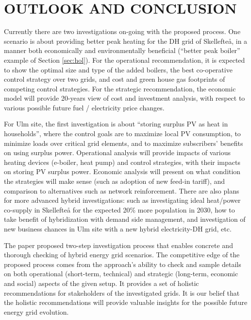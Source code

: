 \documentclass[a4paper,twoside]{article}
\begin{document}
\section{\uppercase{Outlook and Conclusion}}
\label{sec:con} 
Currently there are two investigations on-going with the proposed 
process. One scenario is about providing better peak heating for the
DH grid of Skellefte{\aa}, in a manner both economically and
environmentally beneficial (``better peak boiler'' example of Section
\ref{sec:hol}). 
For the operational recommendation, it is expected to show the optimal
size and type of the added boilers, the best co-operative control
strategy over two grids, and cost and green house gas footprints
of competing control strategies. For the strategic recommendation, the
economic model will provide 20-years view of cost and investment
analysis, with respect to various possible future fuel / electricity
price changes. 

For Ulm site, the first investigation is about ``storing surplus PV as 
heat in households'', where the control goals are to maximize local 
PV consumption, to minimize loads over critical grid elements, and to 
maximize subscribers' benefits on using surplus power. Operational
analysis will provide impacts of various heating devices (e-boiler, 
heat pump) and control strategies, with their impacts on storing PV
surplus power. Economic analysis will present on what condition the 
strategies will make sense (such as adoption of new feed-in tariff),
and comparison to alternatives such as network reinforcement.  
There are also plans for more advanced hybrid investigations: such as  
investigating ideal heat/power co-supply in Skellefte{\aa} for the 
expected 20\% more population in 2030, how to take benefit of  
hybridization with demand side management, and investigation of new
business chances in Ulm site with a new hybrid electricity-DH grid, 
etc.

The paper proposed two-step investigation process that enables
concrete and thorough checking of hybrid energy grid scenarios. The
competitive edge of the proposed process comes from the approach's
ability to check and  sample details on both operational
(short-term, technical) and strategic (long-term, economic and
social) aspects of the given setup. It provides a set of holistic
recommendations for stakeholders of the investigated grids. It is our 
belief that the holistic recommendations will provide valuable
insights for the possible future energy grid evolution.




\newpage



\end{document}

